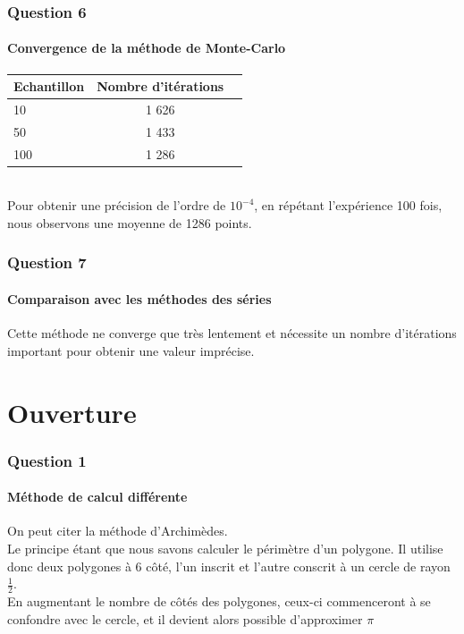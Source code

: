 \documentclass[a4paper,10pt]{report}
\begin{document}
\subsection{Question 6}
\subsubsection{Convergence de la méthode de Monte-Carlo}
\begin{tabular}{|l|c|r|} 
	\hline
	Echantillon & Nombre d'itérations\\
  	\hline
	10 & 1 626\\
	\hline
	50 & 1 433\\
	\hline
	100 & 1 286\\
	\hline	
\end{tabular}\\
Pour obtenir une précision de l'ordre de $10^{-4}$, en répétant l'expérience 100 fois, nous observons une moyenne de 1286 points.
\bigskip

\subsection{Question 7}
\subsubsection{Comparaison avec les méthodes des séries}
Cette méthode ne converge que très lentement et nécessite un nombre d'itérations important pour obtenir une valeur imprécise.

\chapter{Ouverture}
\subsection{Question 1}
\subsubsection{Méthode de calcul différente}
On peut citer la méthode d'Archimèdes.\\
Le principe étant que nous savons calculer le périmètre d'un polygone. Il utilise donc deux polygones à 6 côté, l'un inscrit et l'autre conscrit à un cercle de rayon $\frac{1}{2}$.\\
En augmentant le nombre de côtés des polygones, ceux-ci commenceront à se confondre avec le cercle, et il devient alors possible d'approximer $\pi$\\
\end{document}
